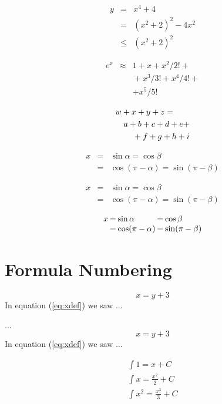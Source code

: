 \documentclass{article}
\begin{document}
\begin{eqnarray}
 y &=& x^4 + 4      \nonumber \\
   &=& (x^2+2)^2 -4x^2 \nonumber \\
   &\le&(x^2+2)^2
\end{eqnarray}

\begin{eqnarray*}
 e^x &\approx& 1+x+x^2/2! + \\
   && {}+x^3/3! + x^4/4! + \\
   && + x^5/5!
\end{eqnarray*}

\begin{eqnarray*}
 \lefteqn{w+x+y+z = }\\
   && a+b+c+d+e+\\
   && {}+f+g+h+i
\end{eqnarray*}

\begin{eqnarray*}
 x&=&\sin \alpha = \cos \beta\\
  &=&\cos(\pi-\alpha) = \sin(\pi-\beta)
\end{eqnarray*}

{\setlength\arraycolsep{0.1em}
 \begin{eqnarray*}
  x&=&\sin \alpha = \cos \beta\\
   &=&\cos(\pi-\alpha) = \sin(\pi-\beta)
 \end{eqnarray*}
}

$$\setlength\arraycolsep{0.1em}
 \begin{array}{rclcl}
  x&=&\sin \alpha &=& \cos \beta\\
   &=&\cos(\pi-\alpha) &=& \sin(\pi-\beta)
 \end{array}
$$

\section{Formula Numbering}

\begin{equation} x=y+3 \label{eq:xdef}
\end{equation}
In equation (\ref{eq:xdef}) we saw $\dots$


...
\begin{equation} x=y+3 \label{eq:xdef}
\end{equation}
In equation (\ref{eq:xdef}) we saw $\dots$

\begin{equation}
\begin{array}{l}
\displaystyle \int 1 = x + C\\
\displaystyle \int x = \frac{x^2}{2} + C \\
\displaystyle \int x^2 = \frac{x^3}{3} + C
\end{array} 
\label{eq:xdef}
\end{equation}
\end{document}
